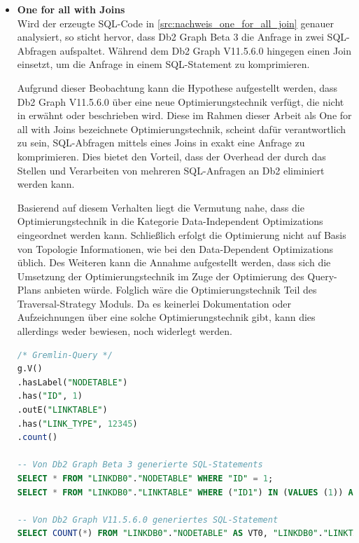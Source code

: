 \begin{itemize}
    \item \textbf{One for all with Joins}\\
    Wird der erzeugte SQL-Code in \autoref{src:nachweis_one_for_all_join} genauer analysiert, so sticht hervor, dass  Db2 Graph Beta 3 die Anfrage in zwei SQL-Abfragen aufspaltet. Während dem Db2 Graph V11.5.6.0 hingegen einen Join einsetzt, um die Anfrage in einem SQL-Statement zu komprimieren.

    Aufgrund dieser Beobachtung kann die Hypothese aufgestellt werden, dass Db2 Graph V11.5.6.0 über eine neue Optimierungstechnik verfügt, die nicht in \cite{sigmod_tian} erwähnt oder beschrieben wird. Diese im Rahmen dieser Arbeit als One for all with Joins bezeichnete Optimierungstechnik, scheint dafür verantwortlich zu sein, SQL-Abfragen mittels eines Joins in exakt eine Anfrage zu komprimieren. Dies bietet den Vorteil, dass der Overhead der durch das Stellen und Verarbeiten von mehreren SQL-Anfragen an Db2 eliminiert werden kann. 

    Basierend auf diesem Verhalten liegt die Vermutung nahe, dass die Optimierungstechnik in die Kategorie Data-Independent Optimizations eingeordnet werden kann. Schließlich erfolgt die Optimierung nicht auf Basis von Topologie Informationen, wie bei den Data-Dependent Optimizations üblich. Des Weiteren kann die Annahme aufgestellt werden, dass sich die Umsetzung der Optimierungstechnik im Zuge der Optimierung des Query-Plans anbieten würde. Folglich wäre die Optimierungstechnik Teil des Traversal-Strategy Moduls. Da es keinerlei Dokumentation oder Aufzeichnungen über eine solche Optimierungstechnik gibt, kann dies allerdings weder bewiesen, noch widerlegt werden. 

\begin{lstlisting}[label=src:nachweis_one_for_all_join,caption={Nachweis One for all with Joins Optimierung},language=SQL]
/* Gremlin-Query */
g.V()
.hasLabel("NODETABLE")
.has("ID", 1)
.outE("LINKTABLE")
.has("LINK_TYPE", 12345)
.count()

-- Von Db2 Graph Beta 3 generierte SQL-Statements
SELECT * FROM "LINKDB0"."NODETABLE" WHERE "ID" = 1;
SELECT * FROM "LINKDB0"."LINKTABLE" WHERE ("ID1") IN (VALUES (1)) AND "LINK_TYPE" = 12345;

-- Von Db2 Graph V11.5.6.0 generiertes SQL-Statement
SELECT COUNT(*) FROM "LINKDB0"."NODETABLE" AS VT0, "LINKDB0"."LINKTABLE" AS ET1 WHERE VT0."ID" = 1 AND ET1."LINK_TYPE" = 12345 AND VT0.ID = ET1.ID1
\end{lstlisting}


\end{itemize}
